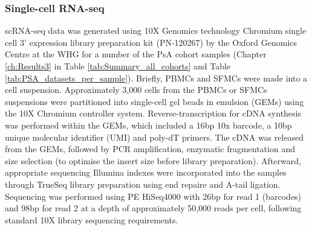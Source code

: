 \subsubsection{Single-cell RNA-seq} 
\label{scRNA_processing}
scRNA-seq data was generated using 10X Genomics technology Chromium single cell 3' expression library preparation kit (PN-120267) by the Oxford Genomics Centre at the WHG for a number of the PsA cohort samples (Chapter \ref{ch:Results3} in Table \ref{tab:Summary_all_cohorts} and Table \ref{tab:PSA_datasets_per_sample}). Briefly, PBMCs and SFMCs were made into a cell suspension. Approximately 3,000 cells from the PBMCs or SFMCs suspensions were partitioned into single-cell gel beads in emulsion (GEMs) using the 10X Chromium controller system. Reverse-transcription for cDNA synthesis was performed within the GEMs, which included a 16bp 10x barcode, a 10bp unique molecular identifier (UMI) and poly-dT primers. The cDNA was released from the GEMs, followed by PCR amplification, enzymatic fragmentation and size selection (to optimise the insert size before library preparation). Afterward, appropriate sequencing Illumina indexes were incorporated into the samples through TrueSeq library preparation using end repaire and A-tail ligation. Sequencing was performed using PE HiSeq4000 with 26bp for read 1 (barcodes) and 98bp for read 2 at a depth of approximately 50,000 reads per cell, following standard 10X library sequencing requirements. 






